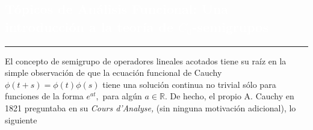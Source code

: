 \author{%
\\
    Rodrigo Ponce \\
    Universidad de Talca \\
        \texttt{\footnotesize rponce@inst-mat.utalca.cl}\vspace{40pt} \\
         }
\pagecolor{white}\afterpage{\nopagecolor}
\pagestyle{eimat}
\begin{titlepage}


\BgThispage
{}
\vspace*{-1.1cm}
\noindent
\def\titulo#1{\section{#1}}

\section{\large\bf\textcolor{white}{T\'opicos de An\'alisis Funcional: Una introducci\'on a la teor\'ia de $C_0$-semigrupos}}

\vspace*{2cm}\par
\noindent

\begin{minipage}{0.5\linewidth}
\begin{minipage}{0.45\linewidth}
    \begin{flushright}
        \printauthor
    \end{flushright}
\end{minipage} \hspace{-3pt}
%
\begin{minipage}{0.02\linewidth}
   \color{ptctitle} \rule{1pt}{175pt}
\end{minipage} 
\end{minipage}
\hspace*{-4.5cm}
%
\begin{minipage}{0.85\linewidth}
\begin{minipage}{0.85\linewidth}
\footnotesize
\vspace{5pt}
    \begin{resumen}
El concepto de semigrupo de operadores lineales acotados tiene su ra\'iz en la simple observaci\'on de que la ecuaci\'on funcional de Cauchy $\phi(t+s)=\phi(t)\phi(s)$ tiene una soluci\'on continua no trivial s\'olo para funciones de la forma $e^{at},$ para alg\'un $a\in\mathbb{R}.$ De hecho, el propio A. Cauchy en 1821 preguntaba en su {\em Cours d'Analyse,} (sin ninguna motivaci\'on adicional), lo siguiente


\end{resumen}
\end{minipage}
\end{minipage}
\end{titlepage}
